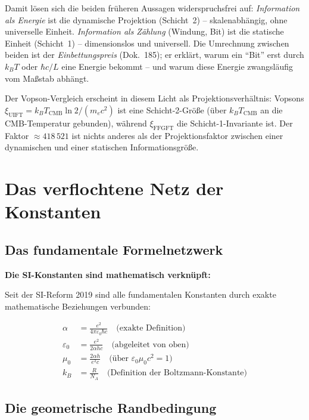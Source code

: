 	Damit lösen sich die beiden früheren Aussagen widerspruchsfrei auf:
	\emph{Information als Energie} ist die dynamische Projektion (Schicht~2) --
	skalenabhängig, ohne universelle Einheit. \emph{Information als Zählung}
	(Windung, Bit) ist die statische Einheit (Schicht~1) -- dimensionslos und
	universell. Die Umrechnung zwischen beiden ist der \emph{Einbettungspreis}
	(Dok.~185); er erklärt, warum ein ``Bit'' erst durch $k_B T$ oder $\hbar c/L$ eine
	Energie bekommt -- und warum diese Energie zwangsläufig vom Maßstab abhängt.

	Der Vopson-Vergleich erscheint in diesem Licht als Projektionsverhältnis: Vopsons
	$\xi_{\text{UIFT}} = k_B T_{\text{CMB}} \ln 2 / (m_e c^2)$ ist eine
	Schicht-2-Größe (über $k_B T_{\text{CMB}}$ an die CMB-Temperatur gebunden),
	während $\xi_{\text{FFGFT}}$ die Schicht-1-Invariante ist. Der Faktor
	$\approx 418\,521$ ist nichts anderes als der Projektionsfaktor zwischen einer
	dynamischen und einer statischen Informationsgröße.

	\section{Das verflochtene Netz der Konstanten}
	
	\subsection{Das fundamentale Formelnetzwerk}
	
	\begin{derivation}
		\textbf{Die SI-Konstanten sind mathematisch verknüpft:}
		
		Seit der SI-Reform 2019 sind alle fundamentalen Konstanten durch exakte mathematische Beziehungen verbunden:
		
		\begin{align}
			\alpha &= \frac{e^2}{4\pi\varepsilon_0\hbar c} \quad \text{(exakte Definition)} \\
			\varepsilon_0 &= \frac{e^2}{2\alpha h c} \quad \text{(abgeleitet von oben)} \\
			\mu_0 &= \frac{2\alpha h}{e^2 c} \quad \text{(über } \varepsilon_0\mu_0c^2 = 1) \\
			k_B &= \frac{R}{N_A} \quad \text{(Definition der Boltzmann-Konstante)}
		\end{align}
	\end{derivation}
	
	\subsection{Die geometrische Randbedingung}
	
